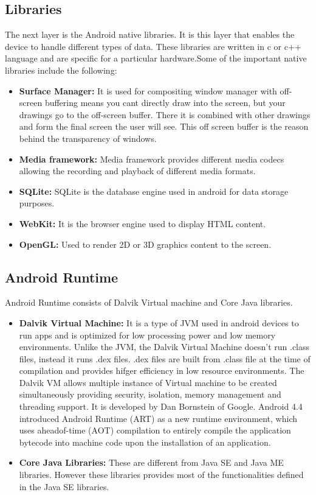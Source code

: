 \subsection{Libraries}
The next layer is the Android native libraries. It is this layer that enables the device to handle different types of data. These libraries are written in c or c++ language and are specific for a particular hardware.Some of the important native libraries include the following: 
\begin{itemize}
  \item \textbf{Surface Manager:} It is used for compositing window manager with off-screen buffering means you cant directly draw into the screen, but your drawings go to the off-screen buffer. There it is combined with other drawings and form the final screen the user will see. This off screen buffer is the reason behind the transparency of windows.
  \item \textbf{Media framework:} Media framework provides different media codecs allowing the recording and playback of different media formats.
  \item \textbf {SQLite:} SQLite is the database engine used in android for data storage purposes.
  \item \textbf{WebKit:} It is the browser engine used to display HTML content.
  \item\textbf{ OpenGL:} Used to render 2D or 3D graphics content to the screen.
  
\end{itemize}

\subsection{Android Runtime}
Android Runtime consists of Dalvik Virtual machine and Core Java libraries. 
\begin{itemize}
	\item \textbf{Dalvik Virtual Machine:}  It is a type of JVM used in android devices to run apps and is optimized for low processing power and low memory environments. Unlike the JVM, the Dalvik Virtual Machine doesn’t run .class files, instead it runs .dex files. .dex files are built from .class file at the time of compilation and provides hifger efficiency in low resource environments. The Dalvik VM allows multiple instance of Virtual machine to be created simultaneously providing security, isolation, memory management and threading support. It is developed by Dan Bornstein of Google. 
	Android 4.4 introduced Android Runtime (ART) as a new runtime environment, which uses aheadof-time (AOT) compilation to entirely compile the application bytecode into machine code upon the installation of an application.
	
	\item \textbf{Core Java Libraries:} These are different from Java SE and Java ME libraries. However these libraries provides most of the functionalities defined in the Java SE libraries.
\end{itemize}

